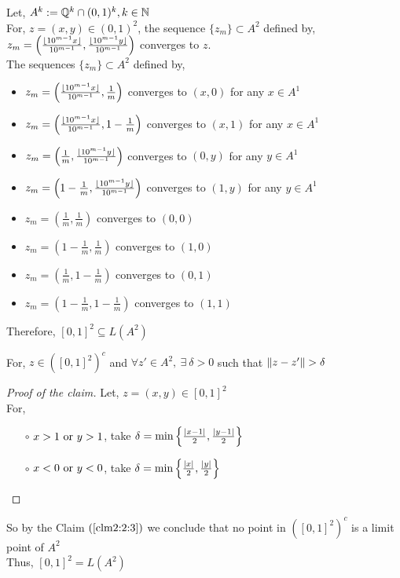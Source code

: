 Let, $ A^k := \mathbb{Q}^k \cap (0,1)^k, k \in \mathbb{N} $ 
\\
For, $ z=(x,y) \in (0,1)^2 $, the sequence $ \{z_m\} \subset A^2 $ defined by, $ z_m = \left( 
  \frac{\lfloor {10^{m-1}x} \rfloor}{10^{m-1}},
  \frac{\lfloor {10^{m-1}y} \rfloor}{10^{m-1}}
 \right) $ 
converges to $ z $.
\\
The sequences $ \{z_m\} \subset A^2 $ defined by,
\begin{itemize}
  \item $ z_m = \left(\frac{\lfloor {10^{m-1}x} \rfloor}{10^{m-1}},\frac{1}{m}\right) $ converges to $(x,0)$ for any $ x \in A^1 $
  \item $ z_m = \left(\frac{\lfloor {10^{m-1}x} \rfloor}{10^{m-1}},1-\frac{1}{m}\right) $ converges to $(x,1)$ for any $ x \in A^1 $
  \item $ z_m = \left(\frac{1}{m}, \frac{\lfloor {10^{m-1}y} \rfloor}{10^{m-1}}\right) $ converges to $(0,y)$ for any $ y \in A^1 $
  \item $ z_m = \left(1-\frac{1}{m}, \frac{\lfloor {10^{m-1}y} \rfloor}{10^{m-1}}\right) $ converges to $(1,y)$ for any $ y \in A^1 $
  \item $ z_m = \left(\frac{1}{m},\frac{1}{m}\right) $ converges to $(0,0)$
  \item $ z_m = \left(1-\frac{1}{m},\frac{1}{m}\right) $ converges to $(1,0)$
  \item $ z_m = \left(\frac{1}{m},1-\frac{1}{m}\right) $ converges to $(0,1)$
  \item $ z_m = \left(1-\frac{1}{m},1-\frac{1}{m}\right) $ converges to $(1,1)$
\end{itemize}

Therefore, $ [0,1]^2 \subseteq L(A^2) $ 

\begin{claim}\label{clm2:2:3}
  For, $ z \in ([0,1]^2)^c $ and $ \forall z' \in A^2, \ \exists \ \delta >0$  such that $ \norm{z-z'}>\delta $ 
\end{claim}
\begin{proof}[Proof of the claim]
  Let, $ z = (x,y) \in [0,1]^2 $
  \\
  For, 
  \begin{itemize}
    \item[$\circ$] $ x > 1 \ {\rm or} \ y > 1 $, take $ \delta = \min{ \left\{ 
      \frac{\left| {x-1} \right|}{2}, \frac{\left| {y-1} \right|}{2}
     \right\} }$ 
    \item[$\circ$] $ x < 0 \ {\rm or} \ y < 0 $, take $ \delta = \min{ \left\{ 
      \frac{\left| {x} \right|}{2}, \frac{\left| {y} \right|}{2}
     \right\} }$
  \end{itemize}
\end{proof}
So by the Claim $ (\ref{clm2:2:3}) $ we conclude that no point in $ ([0,1]^2)^c $ is a limit point of $ A^2 $ \\
Thus, $ [0,1]^2 = L(A^2) $
